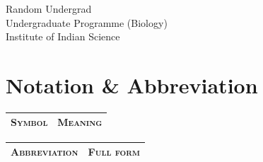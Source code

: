 \documentclass[a4paper, oneside, 11pt]{book}
\begin{document}
Random Undergrad\\
Undergraduate Programme (Biology)\\
Institute of Indian Science\\[2em]
\newpage

\chapter*{Notation \& Abbreviation}
\begin{center}
\begin{tabular}{| c | l |}
\hline
	\textsc{Symbol} & \textsc{Meaning}\\
	\hline\hline

\end{tabular}
\end{center}


\begin{center}
\begin{tabular}{| c | l |}
\hline
	\textsc{Abbreviation} & \textsc{Full form}\\
	\hline\hline
	\end{tabular}
\end{center}


{
\hypersetup{linkcolor=black}
\begin{singlespace}
\newpage\tableofcontents
\newpage\listoffigures
\newpage\listoftables
\end{singlespace}
}


\newpage
{}
\mainmatter
\end{document}
